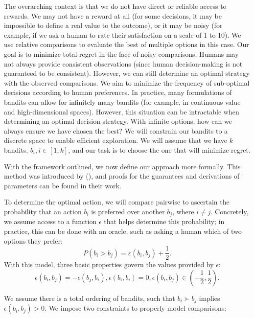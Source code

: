 \documentclass[
  letterpaper,
  numbers=noenddot,
  DIV=11]{scrreprt}
\theoremstyle{plain}
\theoremstyle{definition}
\theoremstyle{remark}
\begin{document}
The overarching context is that we do not have direct or reliable access
to rewards. We may not have a reward at all (for some decisions, it may
be impossible to define a real value to the outcome), or it may be noisy
(for example, if we ask a human to rate their satisfaction on a scale of
1 to 10). We use relative comparisons to evaluate the best of multiple
options in this case. Our goal is to minimize total regret in the face
of noisy comparisons. Humans may not always provide consistent
observations (since human decision-making is not guaranteed to be
consistent). However, we can still determine an optimal strategy with
the observed comparisons. We aim to minimize the frequency of
sub-optimal decisions according to human preferences. In practice, many
formulations of bandits can allow for infinitely many bandits (for
example, in continuous-value and high-dimensional spaces). However, this
situation can be intractable when determining an optimal decision
strategy. With infinite options, how can we always ensure we have chosen
the best? We will constrain our bandits to a discrete space to enable
efficient exploration. We will assume that we have \(k\) bandits,
\(b_i, i \in [1, k]\), and our task is to choose the one that will
minimize regret.

With the framework outlined, we now define our approach more formally.
This method was introduced by (), and proofs for the guarantees and derivations of parameters can
be found in their work.

To determine the optimal action, we will compare pairwise to ascertain
the probability that an action \(b_i\) is preferred over another
\(b_j\), where \(i \ne j\). Concretely, we assume access to a function
\(\epsilon\) that helps determine this probability; in practice, this
can be done with an oracle, such as asking a human which of two options
they prefer: \[P(b_i > b_j) = \varepsilon(b_i, b_j) + \frac{1}{2}.\]
With this model, three basic properties govern the values provided by
\(\epsilon\):
\[\epsilon(b_i, b_j) = -\epsilon(b_j, b_i), \epsilon(b_i, b_i) = 0, \epsilon(b_i, b_j) \in \left(-\frac{1}{2}, \frac{1}{2} \right).\]

We assume there is a total ordering of bandits, such that
\(b_i \succ b_j\) implies \(\epsilon(b_i, b_j) > 0\). We impose two
constraints to properly model comparisons:
\end{document}
